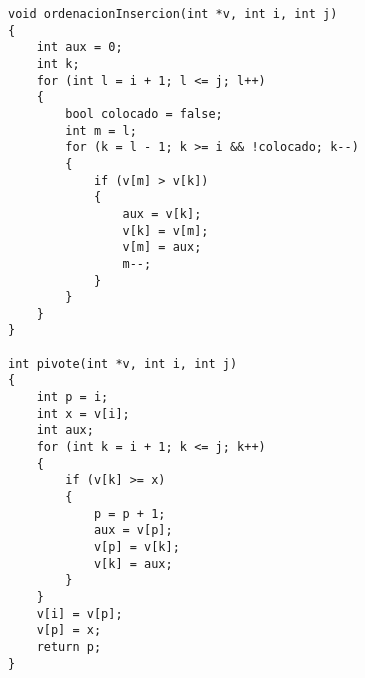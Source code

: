 \begin{lstlisting}
void ordenacionInsercion(int *v, int i, int j)
{
    int aux = 0;
    int k;
    for (int l = i + 1; l <= j; l++)
    {
        bool colocado = false;
        int m = l;
        for (k = l - 1; k >= i && !colocado; k--)
        {
            if (v[m] > v[k])
            {
                aux = v[k];
                v[k] = v[m];
                v[m] = aux;
                m--;
            }
        }
    }
}

int pivote(int *v, int i, int j)
{
    int p = i;
    int x = v[i];
    int aux;
    for (int k = i + 1; k <= j; k++)
    {
        if (v[k] >= x)
        {
            p = p + 1;
            aux = v[p];
            v[p] = v[k];
            v[k] = aux;
        }
    }
    v[i] = v[p];
    v[p] = x;
    return p;
}
\end{lstlisting}
